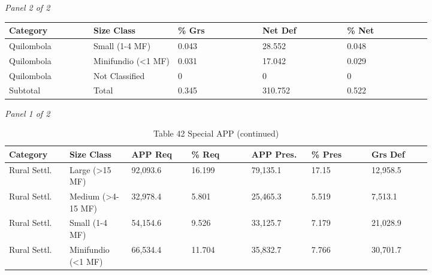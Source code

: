 \documentclass[12pt]{article}
\begin{document}
\begin{landscape}
\begin{table}[H]
\textit{Panel 2 of 2}\\[2pt]
{\fontsize{12}{14}\selectfont
\setlength{\tabcolsep}{3pt}
\renewcommand{\arraystretch}{1.08}
\begin{tabular}{p{0.164\linewidth}p{0.164\linewidth}p{0.164\linewidth}p{0.164\linewidth}p{0.164\linewidth}}
\toprule
Category & Size Class & \% Grs & Net Def & \% Net \\
\midrule
Quilombola & Small (1-4 MF) & 0.043 & 28.552 & 0.048 \\
Quilombola & Minifundio (<1 MF) & 0.031 & 17.042 & 0.029 \\
Quilombola & Not Classified & 0 & 0 & 0 \\
Subtotal & Total & 0.345 & 310.752 & 0.522 \\
\bottomrule
\end{tabular}
}
\end{table}
\begin{table}[H]
\centering
\caption{Table 42 Special APP (continued)}
\textit{Panel 1 of 2}\\[2pt]
{\fontsize{12}{14}\selectfont
\setlength{\tabcolsep}{3pt}
\renewcommand{\arraystretch}{1.08}
\begin{tabular}{p{0.117\linewidth}p{0.117\linewidth}p{0.117\linewidth}p{0.117\linewidth}p{0.117\linewidth}p{0.117\linewidth}p{0.117\linewidth}}
\toprule
Category & Size Class & APP Req & \% Req & APP Pres. & \% Pres & Grs Def \\
\midrule
Rural Settl. & Large (>15 MF) & 92,093.6 & 16.199 & 79,135.1 & 17.15 & 12,958.5 \\
Rural Settl. & Medium (>4-15 MF) & 32,978.4 & 5.801 & 25,465.3 & 5.519 & 7,513.1 \\
Rural Settl. & Small (1-4 MF) & 54,154.6 & 9.526 & 33,125.7 & 7.179 & 21,028.9 \\
Rural Settl. & Minifundio (<1 MF) & 66,534.4 & 11.704 & 35,832.7 & 7.766 & 30,701.7 \\
\bottomrule
\end{tabular}
}

\vspace{0.6em}


\end{table}
\end{landscape}
\end{document}
